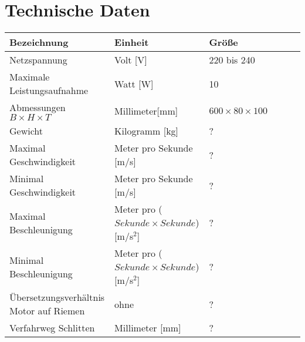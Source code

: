 %
%

\chapter{Technische Daten}
	\fontsize{8}{10}\selectfont
\begin{tabularx}{\textwidth}{|X|X|X|X|p{1cm}|X|}
	\hline 
	\textbf{Bezeichnung} & \textbf{Einheit} & \textbf{Größe} \\ \hline
	Netzspannung & Volt [V] & 220 bis 240  \\
	\hline
	Maximale Leistungsaufnahme & Watt [W] & 10  \\
	\hline
    Abmessungen $B \times H \times T$ & Millimeter[mm] & $600 \times 80 \times 100$ \\
    \hline
    Gewicht & Kilogramm [kg] & ? \\
    \hline 
    Maximal Geschwindigkeit & Meter pro Sekunde [m/s] & ?\\
    \hline	
    Minimal Geschwindigkeit & Meter pro Sekunde [m/s] & ?\\
    \hline
    Maximal Beschleunigung & Meter pro ($Sekunde \times Sekunde$) [m/s$^{2}$] & ? \\
    \hline
    Minimal Beschleunigung & Meter pro ($Sekunde \times Sekunde$) [m/s$^{2}$] & ? \\
    \hline
    Übersetzungsverhältnis Motor auf Riemen & ohne & ?\\
    \hline
    Verfahrweg Schlitten & Millimeter [mm] & ? \\
    \hline
    \end{tabularx}





